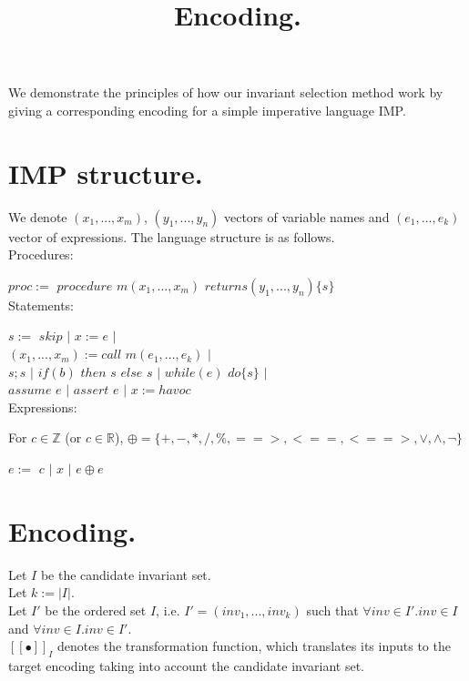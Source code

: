\documentclass[a4paper,12pt]{article}
\title{Encoding.}
\date{}
\begin{document}
	\maketitle
	
	We demonstrate the principles of how our invariant selection method work by giving a corresponding encoding for a simple imperative language IMP.
	
	\section{IMP structure.}	
    We denote $(x_1,..., x_m)$, $(y_1,..., y_n)$ vectors of variable names and $(e_1,...,e_k)$ vector of expressions.
    The language structure is as follows.
    \\
    
    Procedures:
   
    $proc:=$ 
    $procedure$ $m(x_1,...,x_m)$ 
    $returns(y_1,...,y_n)\{s\}$
    \\
    
    Statements:
    
    $s:=$ $skip$ $|$ $x:=e$ $|$ \\ 
    \- \hspace{1.2cm}
    $(x_1,...,x_m):=call$ $m(e_1,...,e_k)$ $|$ \\ 
    \- \hspace{1.2cm}
    $s;s$ $|$ $if(b)$ $then$ $s$ $else$ $s$ $|$
    $while(e)$ $do\{s\}$ $|$ \\
    \- \hspace{1.2cm}   
    $assume$ $e$ $|$ $assert$ $e$ $|$ $x:=havoc$
	\\
	
	Expressions:
		
	For $c \in \mathbb{Z}$ (or $c \in \mathbb{R}$), 
	$\oplus=\{+, -,* , /, \%, ==>, <==, <==>, \lor, \land, \lnot\}$
	
	$e:=$ $c$ $|$ $x$ $|$ $e \oplus e$ 	
	
	\section{Encoding.}
	Let $I$ be the candidate invariant set. \\ 
	Let $k := |I|$. \\
	Let $I'$ be the ordered set $I$,
	i.e. $I' = (inv_1,...,inv_k)$ such that
	$\forall inv \in I'.inv \in I$ and
	$\forall inv \in I.inv \in I'$.
	\\
	
	$[[\bullet]]_I$ denotes the transformation function, which translates its inputs to the target encoding taking into account the candidate invariant set. 
	
\end{document}
